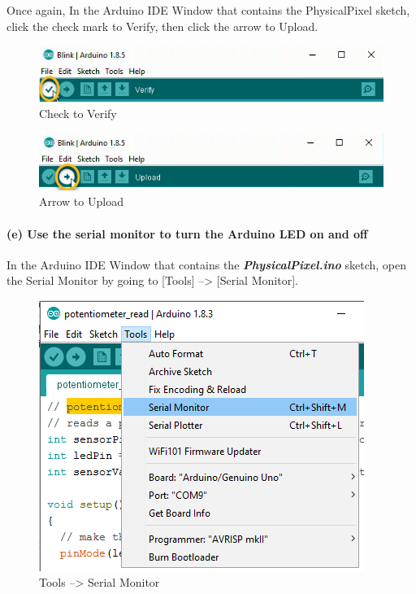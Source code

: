 Once again, In the Arduino IDE Window that contains the PhysicalPixel
sketch, click the check mark to Verify, then click the arrow to Upload.

\begin{figure}[h!]
\centering
\includegraphics{images/Check_to_Verify.png}
\caption{Check to Verify}
\end{figure}

\begin{figure}[h!]
\centering
\includegraphics{images/Arrow_to_Upload.png}
\caption{Arrow to Upload}
\end{figure}

    \hypertarget{e-use-the-serial-monitor-to-turn-the-arduino-led-on-and-off}{%
\paragraph{(e) Use the serial monitor to turn the Arduino LED on and
off}\label{e-use-the-serial-monitor-to-turn-the-arduino-led-on-and-off}}

In the Arduino IDE Window that contains the
\textbf{\emph{PhysicalPixel.ino}} sketch, open the Serial Monitor by
going to {[}Tools{]} --\textgreater{} {[}Serial Monitor{]}.

\begin{figure}
\centering
\includegraphics{images/Tools_SerialMonitor.png}
\caption{Tools --\textgreater{} Serial Monitor}
\end{figure}

